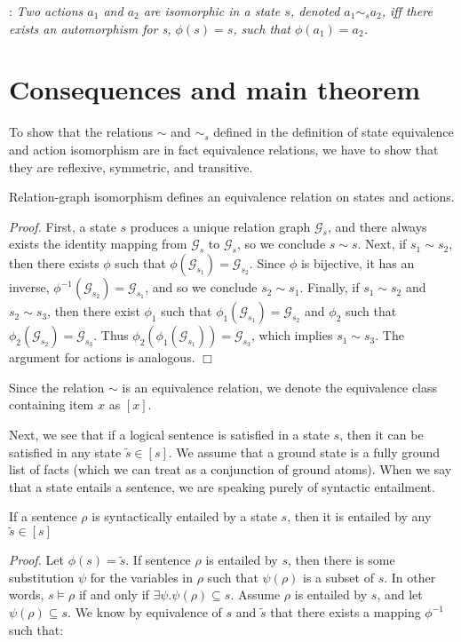 :\emph{ Two actions $a_1$ and
  $a_2$ are {\em isomorphic} in a state $s$, denoted $a_1 \sim_s a_2$,
  iff there exists
 an automorphism for s, 
 $\phi(s)=s$, such that
 $\phi(a_1)=a_2$.}


\section{Consequences and main theorem}
 
To show that the relations $\sim$ and $\sim_s$ defined in the definition of state equivalence and action isomorphism
 are in fact equivalence relations, we have to show that they
are reflexive, symmetric, and
transitive.


\begin{lemma}
Relation-graph isomorphism defines an equivalence relation on states
and actions.
\end{lemma}
\vspace{0in}\emph{Proof.} First, 
a state $s$ produces a unique relation graph
$\mathcal{G}_{s}$, and there always exists the identity mapping from
$\mathcal{G}_{s}$ to $\mathcal{G}_{s}$, so we conclude $s \sim s$. Next, if  $s_1 \sim s_2$, then
there exists  $\phi$ such that
 $\phi(\mathcal{G}_{s_1})=\mathcal{G}_{s_2} $. Since  $\phi$ is
bijective, it has an inverse, 
$\phi^{-1}(\mathcal{G}_{s_2})=\mathcal{G}_{s_1}$, and so we conclude $s_2 \sim
s_1$. Finally, if $s_1 \sim s_2$ and $s_2 \sim s_3$, then there exist
$\phi_1$ such that $\phi_1(\mathcal{G}_{s_1})=\mathcal{G}_{s_2} $ and
$\phi_2$ such that $\phi_2(\mathcal{G}_{s_2})=\mathcal{G}_{s_3}
$. Thus $\phi_2(\phi_1(\mathcal{G}_{s_1}))=\mathcal{G}_{s_3}$, which
implies $s_1 \sim s_3$. The argument for actions is analogous.
\hfill $\Box$



Since the relation $\sim$ is an equivalence relation, we denote the
equivalence class containing item $x$ as $[x]$.


Next, we see that if a logical sentence is satisfied
in a state $s$, then it can be satisfied in any state $\tilde{s} \in
[s]$. We assume that a ground  state is a fully
ground list of facts (which we can treat as a conjunction of ground atoms). 
When we say that a state entails a sentence, we are
speaking purely of syntactic entailment.

\begin{lemma}\label{lemmasat}
If a sentence $\rho$ is syntactically entailed by a state $s$, then it is entailed
by any $\tilde{s} \in [s]$
  \end{lemma}
\vspace{0in}\emph{Proof.}
Let $\phi(s)=\tilde{s}$. If sentence $\rho$ is entailed by $s$, then there is some substitution
$\psi$ for the variables in $\rho$ such that $\psi(\rho)$ is a
subset of $s$.   In other words, $s \models \rho$ if and only if
$\exists \psi . \psi(\rho) \subseteq s$.
Assume  $\rho$ is entailed by $s$, and let  $\psi(\rho) \subseteq
s$. We know by equivalence of $s$ and $\tilde{s}$ that there exists a mapping $ \phi^{-1}$ such that:

